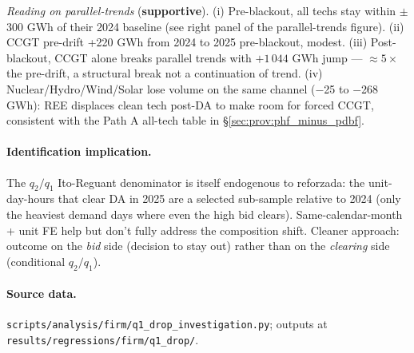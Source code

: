 \documentclass[11pt,a4paper]{article}
\newcommand{\code}[1]{\nolinkurl{#1}}
\begin{document}
\textit{Reading on parallel-trends} (\textbf{supportive}). (i) Pre-blackout, all techs stay within $\pm$300 GWh of their 2024 baseline (see right panel of the parallel-trends figure). (ii) CCGT pre-drift +220 GWh from 2024 to 2025 pre-blackout, modest. (iii) Post-blackout, CCGT alone breaks parallel trends with $+1\,044$ GWh jump --- $\approx 5\times$ the pre-drift, a structural break not a continuation of trend. (iv) Nuclear/Hydro/Wind/Solar lose volume on the same channel ($-$25 to $-$268 GWh): REE displaces clean tech post-DA to make room for forced CCGT, consistent with the Path A all-tech table in \S\ref{sec:prov:phf_minus_pdbf}.

\paragraph{Identification implication.} The $q_2 / q_1$ Ito-Reguant denominator is itself endogenous to reforzada: the unit-day-hours that clear DA in 2025 are a selected sub-sample relative to 2024 (only the heaviest demand days where even the high bid clears). Same-calendar-month + unit FE help but don't fully address the composition shift. Cleaner approach: outcome on the \emph{bid} side (decision to stay out) rather than on the \emph{clearing} side (conditional $q_2 / q_1$).

\paragraph{Source data.} \code{scripts/analysis/firm/q1_drop_investigation.py};
outputs at \code{results/regressions/firm/q1_drop/}.
\end{document}

